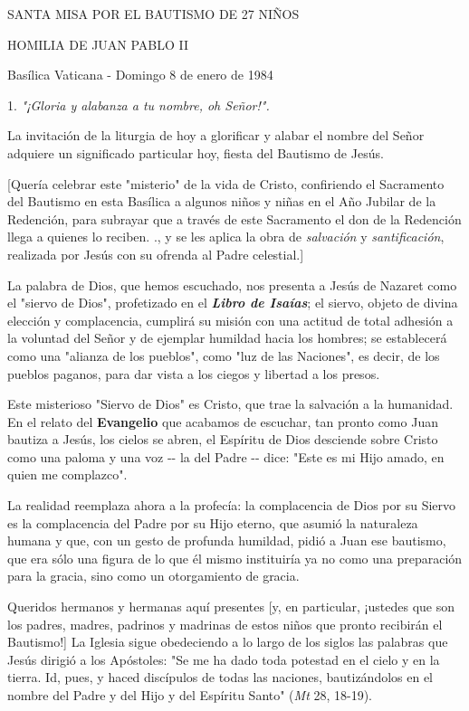 SANTA MISA POR EL BAUTISMO DE 27 NIÑOS

HOMILIA DE JUAN PABLO II

Basílica Vaticana - Domingo 8 de enero de 1984

1. \emph{"¡Gloria y alabanza a tu nombre, oh Señor!".}

La invitación de la liturgia de hoy a glorificar y alabar el nombre del
Señor adquiere un significado particular hoy, fiesta del Bautismo de
Jesús.

{[}Quería celebrar este "misterio" de la vida de Cristo, confiriendo el
Sacramento del Bautismo en esta Basílica a algunos niños y niñas en el
Año Jubilar de la Redención, para subrayar que a través de este
Sacramento el don de la Redención llega a quienes lo reciben. ., y se
les aplica la obra de \emph{salvación} y \emph{santificación}, realizada
por Jesús con su ofrenda al Padre celestial.{]}

La palabra de Dios, que hemos escuchado, nos presenta a Jesús de Nazaret
como el "siervo de Dios", profetizado en el \emph{\textbf{Libro de
		Isaías}}; el siervo, objeto de divina elección y complacencia, cumplirá
su misión con una actitud de total adhesión a la voluntad del Señor y de
ejemplar humildad hacia los hombres; se establecerá como una "alianza de
los pueblos", como "luz de las Naciones", es decir, de los pueblos
paganos, para dar vista a los ciegos y libertad a los presos.

Este misterioso "Siervo de Dios" es Cristo, que trae la salvación a la
humanidad. En el relato del \textbf{Evangelio} que acabamos de escuchar,
tan pronto como Juan bautiza a Jesús, los cielos se abren, el Espíritu
de Dios desciende sobre Cristo como una paloma y una voz -\/- la del
Padre -\/- dice: "Este es mi Hijo amado, en quien me complazco".

La realidad reemplaza ahora a la profecía: la complacencia de Dios por
su Siervo es la complacencia del Padre por su Hijo eterno, que asumió la
naturaleza humana y que, con un gesto de profunda humildad, pidió a Juan
ese bautismo, que era sólo una figura de lo que él mismo instituiría ya
no como una preparación para la gracia, sino como un otorgamiento de
gracia.

Queridos hermanos y hermanas aquí presentes {[}y, en particular,
¡ustedes que son los padres, madres, padrinos y madrinas de estos niños
que pronto recibirán el Bautismo!{]} La Iglesia sigue obedeciendo a lo
largo de los siglos las palabras que Jesús dirigió a los Apóstoles: "Se
me ha dado toda potestad en el cielo y en la tierra. Id, pues, y haced
discípulos de todas las naciones, bautizándolos en el nombre del Padre y
del Hijo y del Espíritu Santo" (\emph{Mt} 28, 18-19).

